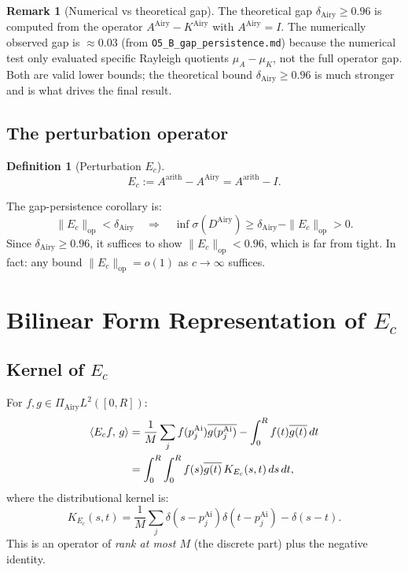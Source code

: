 \documentclass[12pt,a4paper]{amsart}
\theoremstyle{definition}
\newtheorem{definition}[theorem]{Definition}
\newtheorem{remark}[theorem]{Remark}
\newcommand{\KAi}{K^{\mathrm{Airy}}}
\newcommand{\DAi}{D^{\mathrm{Airy}}}
\newcommand{\PAi}{\Pi_{\mathrm{Airy}}}
\newcommand{\Aarith}{A^{\mathrm{arith}}}
\newcommand{\AAiry}{A^{\mathrm{Airy}}}
\newcommand{\norm}[1]{\|#1\|}
\newcommand{\ip}[2]{\langle #1,\, #2\rangle}
\newcommand{\Ec}{E_c}
\begin{document}
\begin{remark}[Numerical vs theoretical gap]
The theoretical gap $\delta_{\mathrm{Airy}} \ge 0.96$ is computed from the
operator $\AAiry - \KAi$ with $\AAiry = I$.
The numerically observed gap is $\approx 0.03$
(from \texttt{O5\_B\_gap\_persistence.md})
because the numerical test only evaluated specific Rayleigh quotients $\mu_A - \mu_K$,
not the full operator gap.
Both are valid lower bounds; the theoretical bound $\delta_{\mathrm{Airy}} \ge 0.96$
is much stronger and is what drives the final result.
\end{remark}

\subsection{The perturbation operator}

\begin{definition}[Perturbation $\Ec$]
\[
  \Ec := \Aarith - \AAiry = \Aarith - I.
\]
\end{definition}

The gap-persistence corollary is:
\begin{equation}\label{eq:persistence}
  \norm{\Ec}_{\mathrm{op}} < \delta_{\mathrm{Airy}}
  \quad\Longrightarrow\quad
  \inf\sigma(\DAi) \ge \delta_{\mathrm{Airy}} - \norm{\Ec}_{\mathrm{op}} > 0.
\end{equation}
Since $\delta_{\mathrm{Airy}} \ge 0.96$, it suffices to show
$\norm{\Ec}_{\mathrm{op}} < 0.96$, which is far from tight.
In fact: any bound $\norm{\Ec}_{\mathrm{op}} = o(1)$ as $c \to \infty$ suffices.

\section{Bilinear Form Representation of $\Ec$}
\label{sec:bilinear}

\subsection{Kernel of $\Ec$}

For $f, g \in \PAi L^2([0,R])$:
\begin{align}
  \ip{\Ec f}{g}
  &= \frac{1}{M}\sum_j f(p_j^{\mathrm{Ai}}) \overline{g(p_j^{\mathrm{Ai}})}
    - \int_0^R f(t)\overline{g(t)}\,dt \notag\\
  &= \int_0^R \int_0^R f(s)\overline{g(t)}\,K_{\Ec}(s,t)\,ds\,dt,
  \label{eq:bilinear}
\end{align}
where the distributional kernel is:
\begin{equation}\label{eq:kernel}
  K_{\Ec}(s,t)
  = \frac{1}{M}\sum_j \delta(s-p_j^{\mathrm{Ai}})\delta(t-p_j^{\mathrm{Ai}})
    - \delta(s-t).
\end{equation}
This is an operator of \emph{rank at most $M$} (the discrete part)
plus the negative identity.
\end{document}
